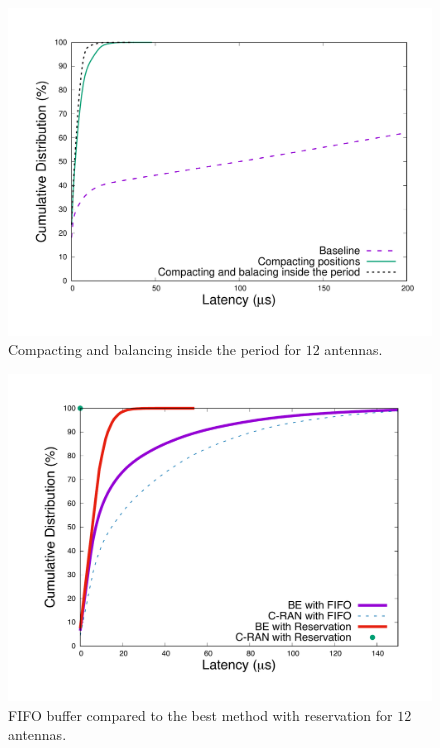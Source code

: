 \documentclass[10pt, conference, letterpaper]{IEEEtran}
\begin{document}
\begin{figure}[h!]
\begin{center}   

      \includegraphics[scale=0.25]{repart1res}
     \caption{Compacting and balancing inside the period for $12$ antennas.}   \label{fig:algocmp}
\end{center}
  \end{figure}
  
  
  
  \begin{figure}[h!]
\begin{center}   

     \includegraphics[scale=0.25]{optim.pdf}
     \caption{FIFO buffer compared to the best method with reservation for $12$ antennas.} \label{fig:optimres}
\end{center}
  \end{figure}
  
\end{document}
